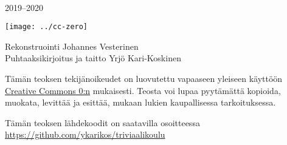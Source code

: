 \newpage
~\vfill
\thispagestyle{empty}
\setlength{\parindent}{0pt}
\setlength{\parskip}{\baselineskip}

2019–2020

\texttt{[image: ../cc-zero]}

Rekonstruointi Johannes Vesterinen \\
Puhtaaksikirjoitus ja taitto Yrjö Kari-Koskinen

Tämän teoksen tekijänoikeudet on luovutettu vapaaseen yleiseen käyttöön  \href{https://creativecommons.org/publicdomain/zero/1.0/deed.fi}{Creative Commons 0:n} mukaisesti. Teosta voi lupaa pyytämättä kopioida, muokata, levittää ja esittää, mukaan lukien kaupallisessa tarkoituksessa.

Tämän teoksen lähdekoodit on saatavilla osoitteessa \url{https://github.com/ykarikos/triviaalikoulu}

